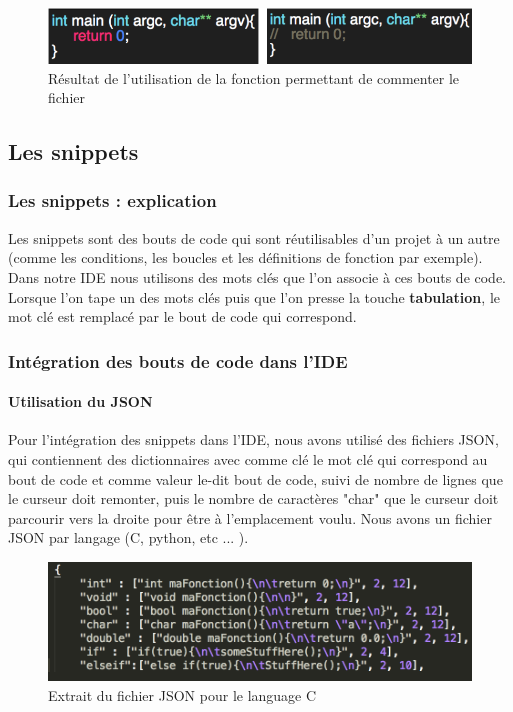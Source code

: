 \documentclass[a4paper,12pt]{article}
\begin{document}
	\begin{figure}[h!]
		\begin{center}
			\includegraphics[scale=0.8]{images/imgs_edit/resultat_commentaire}
			\caption{Résultat de l'utilisation de la fonction permettant de commenter le fichier}
		\end{center}
	\end{figure}
	
	\newpage
	
\subsection{Les snippets}
	
	\subsubsection{Les snippets : explication}

		Les snippets sont des bouts de code qui sont réutilisables d'un projet à un autre (comme les conditions, les boucles et les définitions de fonction par exemple). Dans notre IDE nous utilisons des mots clés que l'on associe à ces bouts de code. Lorsque l'on tape un des mots clés puis que l'on presse la touche \textbf{tabulation}, le mot clé est remplacé par le bout de code qui correspond.

	\subsubsection{Intégration des bouts de code dans l'IDE}

		\paragraph{Utilisation du JSON}

			Pour l'intégration des snippets dans l'IDE, nous avons utilisé des fichiers JSON, qui contiennent des dictionnaires avec comme clé le mot clé qui correspond au bout de code et comme valeur le-dit bout de code, suivi de nombre de lignes que le curseur doit remonter, puis le nombre de caractères "char" que le curseur doit parcourir vers la droite pour être à l'emplacement voulu. Nous avons un fichier JSON par langage (C, python, etc ... ).

			\begin{figure}[h!]
				\begin{center}
					\includegraphics[scale=0.7]{images/exempleJSON}
					\caption{Extrait du fichier JSON pour le language C}
				\end{center}
			\end{figure}
\end{document}
